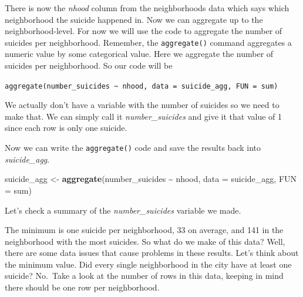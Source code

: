 \documentclass[
  12pt,
]{book}
\newenvironment{Shaded}{\begin{snugshade}}{\end{snugshade}}
\newcommand{\CommentTok}[1]{\textcolor[rgb]{0.56,0.35,0.01}{\textit{#1}}}
\newcommand{\DataTypeTok}[1]{\textcolor[rgb]{0.13,0.29,0.53}{#1}}
\newcommand{\DecValTok}[1]{\textcolor[rgb]{0.00,0.00,0.81}{#1}}
\newcommand{\KeywordTok}[1]{\textcolor[rgb]{0.13,0.29,0.53}{\textbf{#1}}}
\newcommand{\NormalTok}[1]{#1}
\newcommand{\OperatorTok}[1]{\textcolor[rgb]{0.81,0.36,0.00}{\textbf{#1}}}
\newcommand{\StringTok}[1]{\textcolor[rgb]{0.31,0.60,0.02}{#1}}
\begin{document}
There is now the \emph{nhood} column from the neighborhoods data which says which neighborhood the suicide happened in. Now we can aggregate up to the neighborhood-level.
For now we will use the code to aggregate the number of suicides per neighborhood. Remember, the \texttt{aggregate()} command aggregates a numeric value by some categorical value. Here we aggregate the number of suicides per neighborhood. So our code will be

\texttt{aggregate(number\_suicides\ \textasciitilde{}\ nhood,\ data\ =\ suicide\_agg,\ FUN\ =\ sum)}

We actually don't have a variable with the number of suicides so we need to make that. We can simply call it \emph{number\_suicides} and give it that value of 1 since each row is only one suicide.

\begin{Shaded}
\end{Shaded}

Now we can write the \texttt{aggregate()} code and save the results back into \emph{suicide\_agg}.

\begin{Shaded}
\begin{Highlighting}[]
\NormalTok{suicide\_agg <{-}}\StringTok{ }\KeywordTok{aggregate}\NormalTok{(number\_suicides }\OperatorTok{\textasciitilde{}}\StringTok{ }\NormalTok{nhood, }\DataTypeTok{data =}\NormalTok{ suicide\_agg, }\DataTypeTok{FUN =}\NormalTok{ sum)}
\end{Highlighting}
\end{Shaded}

Let's check a summary of the \emph{number\_suicides} variable we made.

\begin{Shaded}
\end{Shaded}

The minimum is one suicide per neighborhood, 33 on average, and 141 in the neighborhood with the most suicides. So what do we make of this data? Well, there are some data issues that cause problems in these results. Let's think about the minimum value. Did every single neighborhood in the city have at least one suicide? No.~Take a look at the number of rows in this data, keeping in mind there should be one row per neighborhood.
\end{document}
